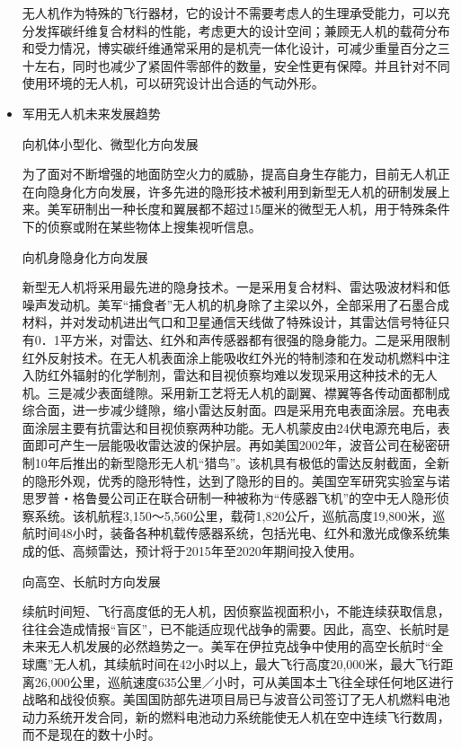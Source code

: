 \documentclass{article}
\begin{document}
\begin{itemize}
    无人机作为特殊的飞行器材，它的设计不需要考虑人的生理承受能力，可以充分发挥碳纤维复合材料的性能，考虑更大的设计空间；兼顾无人机的载荷分布和受力情况，博实碳纤维通常采用的是机壳一体化设计，可减少重量百分之三十左右，同时也减少了紧固件零部件的数量，安全性更有保障。并且针对不同使用环境的无人机，可以研究设计出合适的气动外形。\cite{a7}\par
    \item 军用无人机未来发展趋势\par
    向机体小型化、微型化方向发展\par
为了面对不断增强的地面防空火力的威胁，提高自身生存能力，目前无人机正在向隐身化方向发展，许多先进的隐形技术被利用到新型无人机的研制发展上来。美军研制出一种长度和翼展都不超过15厘米的微型无人机，用于特殊条件下的侦察或附在某些物体上搜集视听信息。\par
向机身隐身化方向发展\par
新型无人机将采用最先进的隐身技术。一是采用复合材料、雷达吸波材料和低噪声发动机。美军“捕食者”无人机的机身除了主梁以外，全部采用了石墨合成材料，并对发动机进出气口和卫星通信天线做了特殊设计，其雷达信号特征只有0．1平方米，对雷达、红外和声传感器都有很强的隐身能力。二是采用限制红外反射技术。在无人机表面涂上能吸收红外光的特制漆和在发动机燃料中注入防红外辐射的化学制剂，雷达和目视侦察均难以发现采用这种技术的无人机。三是减少表面缝隙。采用新工艺将无人机的副翼、襟翼等各传动面都制成综合面，进一步减少缝隙，缩小雷达反射面。四是采用充电表面涂层。充电表面涂层主要有抗雷达和目视侦察两种功能。无人机蒙皮由24伏电源充电后，表面即可产生一层能吸收雷达波的保护层。再如美国2002年，波音公司在秘密研制10年后推出的新型隐形无人机“猎鸟”。该机具有极低的雷达反射截面，全新的隐形外观，优秀的隐形特性，达到了隐形的目的。美国空军研究实验室与诺思罗普・格鲁曼公司正在联合研制一种被称为“传感器飞机”的空中无人隐形侦察系统。该机航程3,150～5,560公里，载荷1,820公斤，巡航高度19,800米，巡航时间48小时，装备各种机载传感器系统，包括光电、红外和激光成像系统集成的低、高频雷达，预计将于2015年至2020年期间投入使用。\par

向高空、长航时方向发展\par
续航时间短、飞行高度低的无人机，因侦察监视面积小，不能连续获取信息，往往会造成情报“盲区”，已不能适应现代战争的需要。因此，高空、长航时是未来无人机发展的必然趋势之一。美军在伊拉克战争中使用的高空长航时“全球鹰”无人机，其续航时间在42小时以上，最大飞行高度20,000米，最大飞行距离26,000公里，巡航速度635公里／小时，可从美国本土飞往全球任何地区进行战略和战役侦察。美国国防部先进项目局已与波音公司签订了无人机燃料电池动力系统开发合同，新的燃料电池动力系统能使无人机在空中连续飞行数周，而不是现在的数十小时。\par


\end{itemize}
\end{document}
